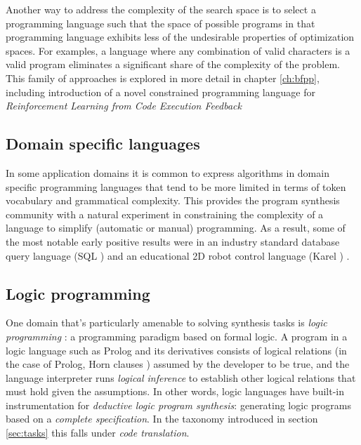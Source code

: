 Another way to address the complexity of the search space is to select a programming language such that the space of possible programs in that programming language exhibits less of the undesirable properties of optimization spaces.
For examples, a language where any combination of valid characters is a valid program \cite{brainfuck} eliminates a significant share of the complexity of the problem.
This family of approaches is explored in more detail in chapter \ref{ch:bfpp}, including  introduction of a novel constrained programming language for \emph{Reinforcement Learning from Code Execution Feedback}

\subsection{Domain specific languages}
\label{sec:dsl}

In some application domains it is common to express algorithms in domain specific programming languages \cite{fowlerDomainspecificLanguages2010, hudakDomainspecificLanguages1997, karsaiDesignGuidelinesDomain2014, kosarComparingGeneralpurposeDomainspecific2010, kosarDomainspecificLanguagesSystematic2016, mernikWhenHowDevelop2005} that tend to be more limited in terms of token vocabulary and grammatical complexity.
This provides the program synthesis community with a natural experiment in constraining the complexity of a language to simplify (automatic or manual) programming.
As a result, some of the most notable early positive results were in an industry standard database query language (SQL \cite{groffSQLCompleteReference2002}) \cite{liCanLlmAlready2024, yuSpiderLargescaleHumanlabeled2018} and an educational 2D robot control language (Karel \cite{pattisKarelRobotGentle1994}) \cite{metainduction}.

\subsection{Logic programming}

One domain that's particularly amenable \cite{devilleLogicProgramSynthesis1994} to solving synthesis tasks is \emph{logic programming} \cite{doetsLogicLogicProgramming1994, lloydFoundationsLogicProgramming2012}: a programming paradigm \cite{floydParadigmsProgramming2007, gorodniaiaStudyProgrammingParadigms2016, krishnamurthi13ProgrammingParadigms2019, vanroyProgrammingParadigmsDummies2009} based on formal logic. 
A program in a logic language such as Prolog \cite{clocksinProgrammingPROLOG2003} and its derivatives consists of logical relations (in the case of Prolog, Horn clauses \cite{kowalskiPredicateLogicProgramming1974}) assumed by the developer to be true, and the language interpreter runs \emph{logical inference} to establish other logical relations that must hold given the assumptions.
In other words, logic languages have built-in instrumentation for \emph{deductive logic program synthesis}: generating logic programs based on a \emph{complete specification}.
In the taxonomy introduced in section \ref{sec:tasks} this falls under \emph{code translation}.

